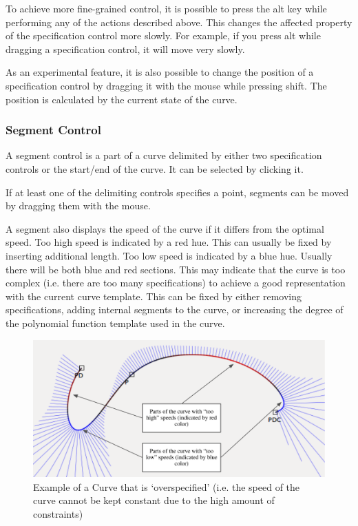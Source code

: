 \documentclass[a4paper]{article}
\begin{document}
					To achieve more fine-grained control, it is possible to press the alt key while performing any of the actions described above. This changes the affected property of the specification control more slowly. For example, if you press alt while dragging a specification control, it will move very slowly.
					
					As an experimental feature, it is also possible to change the position of a specification control by dragging it with the mouse while pressing shift. The position is calculated by the current state of the curve.
				
				\subsubsection{Segment Control}
				
					A segment control is a part of a curve delimited by either two specification controls or the start/end of the curve. It can be selected by clicking it.
					
					If at least one of the delimiting controls specifies a point, segments can be moved by dragging them with the mouse.
					
					A segment also displays the speed of the curve if it differs from the optimal speed. Too high speed is indicated by a red hue. This can usually be fixed by inserting additional length. Too low speed is indicated by a blue hue. Usually there will be both blue and red sections. This may indicate that the curve is too complex (i.e. there are too many specifications) to achieve a good representation with the current curve template. This can be fixed by either removing specifications, adding internal segments to the curve, or increasing the degree of the polynomial function template used in the curve.
				
				\begin{figure}[htb]
					\centering
					\includegraphics[width=\textwidth]{content/output/ui_speeds.pdf}
					\caption{Example of a Curve that is `overspecified' (i.e. the speed of the curve cannot be kept constant due to the high amount of constraints)}
					\label{figure:ui_speeds}
				\end{figure}
				
\end{document}
